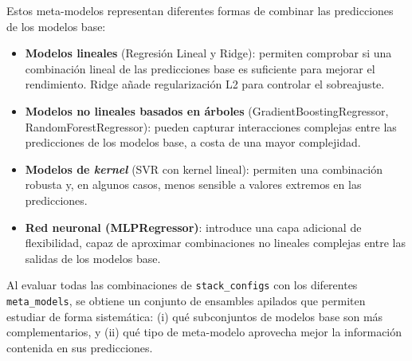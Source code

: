 \begin{table}
    \centering
    \caption{Meta-modelos utilizados en el \textit{stacking} junto con sus parámetros.}
    \label{tab:meta_modelos}
    \footnotesize
\end{table}

Estos meta-modelos representan diferentes formas de combinar las predicciones de los modelos base:

\begin{itemize}
    \item \textbf{Modelos lineales} (Regresión Lineal y Ridge): permiten comprobar si una combinación lineal de las predicciones base es suficiente para mejorar el rendimiento. Ridge añade regularización L2 para controlar el sobreajuste.
    \item \textbf{Modelos no lineales basados en árboles} (GradientBoostingRegressor, RandomForestRegressor): pueden capturar interacciones complejas entre las predicciones de los modelos base, a costa de una mayor complejidad.
    \item \textbf{Modelos de \textit{kernel}} (SVR con kernel lineal): permiten una combinación robusta y, en algunos casos, menos sensible a valores extremos en las predicciones.
    \item \textbf{Red neuronal (MLPRegressor)}: introduce una capa adicional de flexibilidad, capaz de aproximar combinaciones no lineales complejas entre las salidas de los modelos base.
\end{itemize}

Al evaluar todas las combinaciones de \texttt{stack\_configs} con los diferentes \texttt{meta\_models}, se obtiene un conjunto de ensambles apilados que permiten estudiar de forma sistemática:
(i) qué subconjuntos de modelos base son más complementarios, y (ii) qué tipo de meta-modelo aprovecha mejor la información contenida en sus predicciones.





